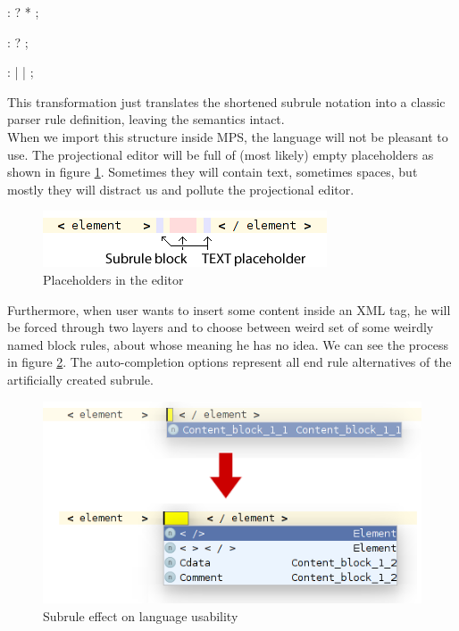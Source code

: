 \begin{antlr}
	          :   ? * ;

	 :    ?
	                 ;

	 :   
	                 |   
	                 |   
	                 ;
\end{antlr}

This transformation just translates the shortened subrule notation into a classic parser rule definition, leaving the semantics intact.
\\

When we import this structure inside MPS, the language will not be pleasant to use.
The projectional editor will be full of (most likely) empty  placeholders as shown in figure \ref{fig:text_placeholders}.
Sometimes they will contain text, sometimes spaces, but mostly they will distract us and pollute the projectional editor.

\begin{figure}[h]
	\centering
	\includegraphics[scale=0.75]{./img/text_placeholders.png}
	\caption{Placeholders in the editor}
	\label{fig:text_placeholders}
\end{figure}

Furthermore, when user wants to insert some content inside an XML tag, he will be forced through two layers and to choose between weird set of some weirdly named block rules, about whose meaning he has no idea.
We can see the process in figure \ref{fig:subrule_problem}.
The auto-completion options represent all end rule alternatives of the artificially created  subrule.
\\

\begin{figure}[h]
	\centering
	\includegraphics[scale=0.75]{./img/subrule_problem.png}
	\caption{Subrule effect on language usability}
	\label{fig:subrule_problem}
\end{figure}

